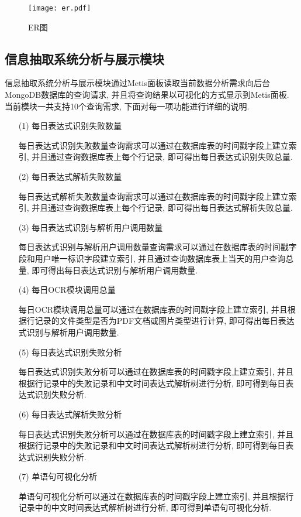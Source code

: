 \begin{figure}[h]
  \centering
  \texttt{[image: er.pdf]}
  \caption{ER图}
  \label{fig:er_graph}
\end{figure}

\subsection{信息抽取系统分析与展示模块}

信息抽取系统分析与展示模块通过Metis面板读取当前数据分析需求向后台MongoDB数据库的查询请求, 并且将查询结果以可视化的方式显示到Metis面板.
当前模块一共支持10个查询需求, 下面对每一项功能进行详细的说明.

\begin{enumerate}
  \item[(1)] 每日表达式识别失败数量

    每日表达式识别失败数量查询需求可以通过在数据库表的时间戳字段上建立索引, 并且通过查询数据库表上每个行记录, 即可得出每日表达式识别失败总量.

  \item[(2)] 每日表达式解析失败数量

    每日表达式解析失败数量查询需求可以通过在数据库表的时间戳字段上建立索引, 并且通过查询数据库表上每个行记录, 即可得出每日表达式解析失败总量.

  \item[(3)] 每日表达式识别与解析用户调用数量

    每日表达式识别与解析用户调用数量查询需求可以通过在数据库表的时间戳字段和用户唯一标识字段建立索引, 并且通过查询数据库表上当天的用户查询总量, 即可得出每日表达式识别与解析用户调用数量.

  \item[(4)] 每日OCR模块调用总量

    每日OCR模块调用总量可以通过在数据库表的时间戳字段上建立索引, 并且根据行记录的文件类型是否为PDF文档或图片类型进行计算, 即可得出每日表达式识别与解析用户调用数量.

  \item[(5)] 每日表达式识别失败分析

    每日表达式识别失败分析可以通过在数据库表的时间戳字段上建立索引, 并且根据行记录中的失败记录和中文时间表达式解析树进行分析, 即可得到每日表达式识别失败分析.

  \item[(6)] 每日表达式解析失败分析

    每日表达式识别失败分析可以通过在数据库表的时间戳字段上建立索引, 并且根据行记录中的失败记录和中文时间表达式解析树进行分析, 即可得到每日表达式识别失败分析.

  \item[(7)] 单语句可视化分析

    单语句可视化分析可以通过在数据库表的时间戳字段上建立索引, 并且根据行记录中的中文时间表达式解析树进行分析, 即可得到单语句可视化分析.
\end{enumerate}


